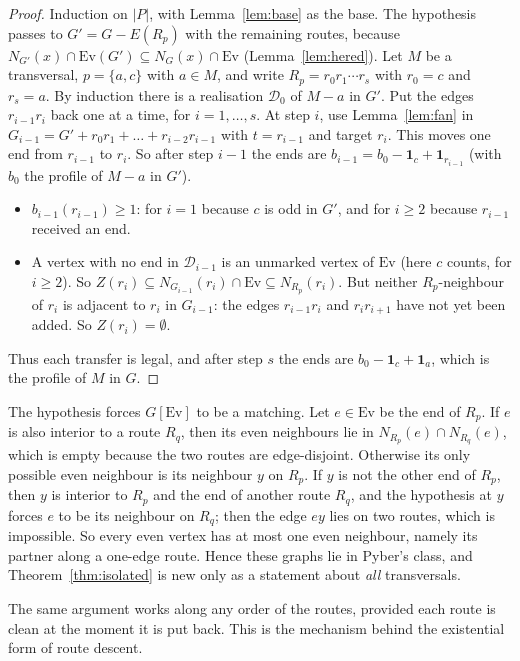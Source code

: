 \documentclass[11pt]{amsart}
\theoremstyle{definition}
\newcommand{\Ev}{\mathrm{Ev}}
\newcommand{\cD}{\mathcal D}
\begin{document}
\begin{proof}
Induction on $|P|$, with Lemma~\ref{lem:base} as the base. The hypothesis passes to
$G'=G-E(R_p)$ with the remaining routes, because $N_{G'}(x)\cap\Ev(G')\subseteq N_G(x)\cap\Ev$
(Lemma~\ref{lem:hered}). Let $M$ be a transversal, $p=\{a,c\}$ with $a\in M$, and write
$R_p=r_0r_1\cdots r_s$ with $r_0=c$ and $r_s=a$. By induction there is a realisation $\cD_0$ of $M-a$ in
$G'$. Put the edges $r_{i-1}r_i$ back one at a time, for $i=1,\dots,s$. At step $i$, use
Lemma~\ref{lem:fan} in $G_{i-1}=G'+r_0r_1+\dots+r_{i-2}r_{i-1}$ with $t=r_{i-1}$ and target $r_i$. This
moves one end from $r_{i-1}$ to $r_i$. So after step $i-1$ the ends are $b_{i-1}=b_0-\mathbf
1_c+\mathbf 1_{r_{i-1}}$ (with $b_0$ the profile of $M-a$ in $G'$).
\begin{itemize}
\item $b_{i-1}(r_{i-1})\ge1$: for $i=1$ because $c$ is odd in $G'$, and for $i\ge2$ because $r_{i-1}$
received an end.
\item A vertex with no end in $\cD_{i-1}$ is an unmarked vertex of $\Ev$ (here $c$ counts, for $i\ge2$).
So $Z(r_i)\subseteq N_{G_{i-1}}(r_i)\cap\Ev\subseteq N_{R_p}(r_i)$. But neither $R_p$-neighbour of
$r_i$ is adjacent to $r_i$ in $G_{i-1}$: the edges $r_{i-1}r_i$ and $r_ir_{i+1}$ have not yet been added.
So $Z(r_i)=\emptyset$.
\end{itemize}
Thus each transfer is legal, and after step $s$ the ends are $b_0-\mathbf 1_c+\mathbf 1_a$, which is the
profile of $M$ in $G$.
\end{proof}

The hypothesis forces $G[\Ev]$ to be a matching. Let $e\in\Ev$ be the end of $R_p$. If $e$ is also
interior to a route $R_q$, then its even neighbours lie in $N_{R_p}(e)\cap N_{R_q}(e)$, which is empty
because the two routes are edge-disjoint. Otherwise its only possible even neighbour is its neighbour
$y$ on $R_p$. If $y$ is not the other end of $R_p$, then $y$ is interior to $R_p$ and the end of another
route $R_q$, and the hypothesis at $y$ forces $e$ to be its neighbour on $R_q$; then the edge $ey$ lies on
two routes, which is impossible. So every even vertex has at most one even neighbour, namely its partner
along a one-edge route. Hence these graphs lie in Pyber's class, and Theorem~\ref{thm:isolated} is new
only as a statement about \emph{all} transversals.

The same argument works along any order of the routes, provided each route is clean at the moment it
is put back. This is the mechanism behind the existential form of route descent.
\end{document}
